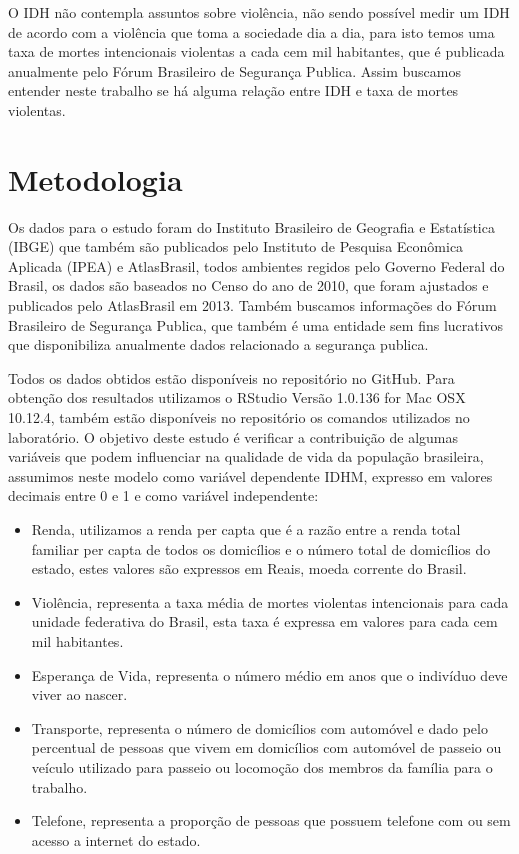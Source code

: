 \documentclass[journal]{IEEEtran}
\begin{document}
O IDH não contempla assuntos sobre violência, não sendo possível medir um IDH de acordo com a violência que toma a sociedade dia a dia, para isto temos uma taxa de mortes intencionais violentas a cada cem mil habitantes, que é publicada anualmente pelo Fórum Brasileiro de Segurança Publica\cite{FBSP2017}. Assim buscamos entender neste trabalho se há alguma relação entre IDH e taxa de mortes violentas.  

\section{Metodologia}

Os dados para o estudo foram do Instituto Brasileiro de Geografia e Estatística (IBGE)\cite{IBGE2017} que também são publicados pelo Instituto de Pesquisa Econômica Aplicada (IPEA)\cite{Ipea2017} e AtlasBrasil\cite{Atlas2017}, todos ambientes regidos pelo Governo Federal do Brasil, os dados são baseados no Censo do ano de 2010, que foram ajustados e publicados pelo AtlasBrasil em 2013. Também buscamos informações do Fórum Brasileiro de Segurança Publica\cite{FBSP2017}, que também é uma entidade sem fins lucrativos que disponibiliza anualmente dados relacionado a segurança publica.

Todos os dados obtidos estão disponíveis no repositório\cite{RepoIgor2017} no GitHub. Para obtenção dos resultados utilizamos o RStudio Versão 1.0.136 for Mac OSX 10.12.4, também estão disponíveis no repositório\cite{RepoIgor2017} os comandos utilizados no laboratório. O objetivo deste estudo é verificar a contribuição de algumas variáveis que podem influenciar na qualidade de vida da população brasileira, assumimos neste modelo como variável dependente IDHM, expresso em valores decimais entre 0 e 1 e como variável independente:

\begin{itemize}
\item {Renda, utilizamos a renda per capta que é a razão entre a renda total familiar per capta de todos os domicílios e o número total de domicílios do estado, estes valores são expressos em Reais, moeda corrente do Brasil.}
\item {Violência, representa a taxa média de mortes violentas intencionais para cada unidade federativa do Brasil, esta taxa é expressa em valores para cada cem mil habitantes.}
\item {Esperança de Vida, representa o número médio em anos que o indivíduo deve viver ao nascer.}
\item {Transporte, representa o número de domicílios com automóvel e dado pelo percentual de pessoas que vivem em domicílios com automóvel de passeio ou veículo utilizado para passeio ou locomoção dos membros da família para o trabalho.}
\item {Telefone, representa a proporção de pessoas que possuem telefone com ou sem acesso a internet do estado.}
\end{itemize}
\end{document}
